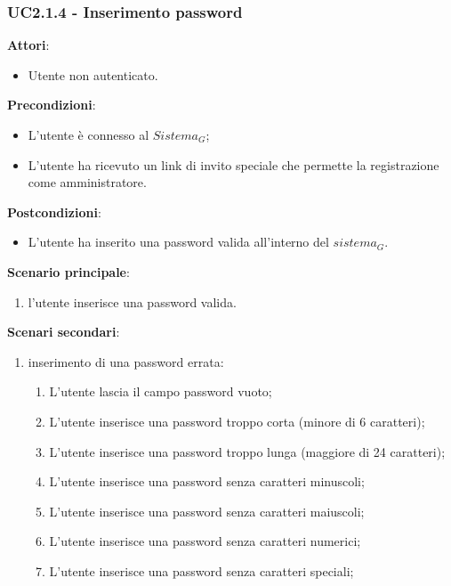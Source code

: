 \subsubsection{UC2.1.4 - Inserimento password}\label{usecase:2_1_4}
\textbf{Attori}:
\begin{itemize}
    \item Utente non autenticato.
\end{itemize}
\textbf{Precondizioni}:
\begin{itemize}
    \item L'utente è connesso al $\textit{Sistema}_G$;
    \item L'utente ha ricevuto un link di invito speciale che permette la registrazione come amministratore.
\end{itemize}
\textbf{Postcondizioni}:
\begin{itemize}
    \item L'utente ha inserito una password valida all'interno del $\textit{sistema}_G$.
\end{itemize}
\textbf{Scenario principale}:
\begin{enumerate}
    \item l'utente inserisce una password valida.
\end{enumerate}
\textbf{Scenari secondari}:

\begin{enumerate}
    \item inserimento di una password errata:
    \begin{enumerate}
            \item L'utente lascia il campo password vuoto;
            \item L'utente inserisce una password troppo corta (minore di 6 caratteri);
            \item L'utente inserisce una password troppo lunga (maggiore di 24 caratteri);
            \item L'utente inserisce una password senza caratteri minuscoli;
            \item L'utente inserisce una password senza caratteri maiuscoli;
            \item L'utente inserisce una password senza caratteri numerici;
            \item L'utente inserisce una password senza caratteri speciali;
        \end{enumerate} 
\end{enumerate}